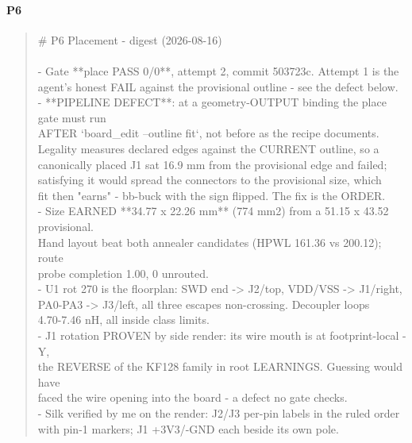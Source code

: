 \documentclass[11pt,a4paper]{article}
\begin{document}
\paragraph*{P6}
\begin{quote}\small\ttfamily\raggedright
\# P6 Placement - digest (2026-08-16)\\
~\\
- Gate {*}{*}place PASS 0/0{*}{*}, attempt 2, commit 503723c. Attempt 1 is the\\
  agent's honest FAIL against the provisional outline - see the defect below.\\
- {*}{*}PIPELINE DEFECT{*}{*}: at a geometry-OUTPUT binding the place gate must run\\
  AFTER `board\_edit --outline fit`, not before as the recipe documents.\\
  Legality measures declared edges against the CURRENT outline, so a\\
  canonically placed J1 sat 16.9 mm from the provisional edge and failed;\\
  satisfying it would spread the connectors to the provisional size, which\\
  fit then "earns" - bb-buck with the sign flipped. The fix is the ORDER.\\
- Size EARNED {*}{*}34.77 x 22.26 mm{*}{*} (774 mm2) from a 51.15 x 43.52 provisional.\\
  Hand layout beat both annealer candidates (HPWL 161.36 vs 200.12); route\\
  probe completion 1.00, 0 unrouted.\\
- U1 rot 270 is the floorplan: SWD end -\textgreater{} J2/top, VDD/VSS -\textgreater{} J1/right,\\
  PA0-PA3 -\textgreater{} J3/left, all three escapes non-crossing. Decoupler loops\\
  4.70-7.46 nH, all inside class limits.\\
- J1 rotation PROVEN by side render: its wire mouth is at footprint-local -Y,\\
  the REVERSE of the KF128 family in root LEARNINGS. Guessing would have\\
  faced the wire opening into the board - a defect no gate checks.\\
- Silk verified by me on the render: J2/J3 per-pin labels in the ruled order\\
  with pin-1 markers; J1 +3V3/-GND each beside its own pole.
\end{quote}
\end{document}
